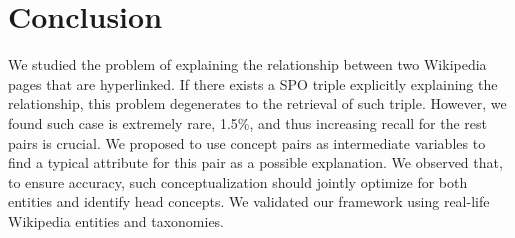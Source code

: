 \section{Conclusion}
\label{sec:conclusion}

We studied the problem of explaining the relationship between two Wikipedia pages that are hyperlinked. If there exists a SPO triple explicitly explaining the relationship, this problem degenerates to the retrieval of such triple. However, we found such case is extremely rare, 1.5\%, and thus increasing recall for the rest pairs is crucial. We proposed to use concept pairs as intermediate variables to find a typical attribute for this pair as a possible explanation. We observed that, to ensure accuracy, such conceptualization should jointly optimize for both entities and identify head concepts. We validated our framework using real-life Wikipedia entities and taxonomies.

